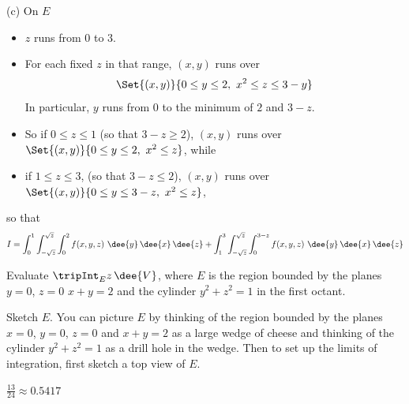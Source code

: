 \begin{solution}
(c) On $E$
\begin{itemize}
\item 
$z$ runs from $0$ to $3$.
\item
For each fixed $z$ in that range, $(x,y)$ runs over
\begin{equation*}
\Set{(x,y)}{0\le y\le 2,\ x^2\le z\le 3-y}
\end{equation*}
In particular, $y$ runs from $0$ to the minimum of $2$ and $3-z$.
\item 
So if $0\le z\le 1$ (so that $3-z\ge 2$), 
$(x,y)$ runs over $\Set{(x,y)}{0\le y\le 2,\ x^2\le z}$, while
\item
if $1\le z\le 3$, 
(so that $3-z\le 2$), 
$(x,y)$ runs over $\Set{(x,y)}{0\le y\le 3-z,\ x^2\le z}$,
\end{itemize}
so that
\begin{align*}
I= \int_0^1  \int_{-\sqrt{z}}^{\sqrt{z}}\int_0^2 f(x,y,z)\    
                 \dee{y}\,\dee{x}\,\dee{z}
+\int_1^3 \int_{-\sqrt{z}}^{\sqrt{z}}  \int_0^{3-z} f(x,y,z)\    
                 \dee{y}\,\dee{x}\,\dee{z}
\end{align*}
\end{solution}

\begin{question}[M200 2002D] %
Evaluate $\tripInt_E z\,\dee{V}$, where $E$ is the region bounded
by the planes $y=0$, $z=0$ $x+y=2$ and the cylinder $y^2+z^2=1$ in the
first octant.
\end{question}

\begin{hint}
Sketch $E$. You can picture $E$ by thinking of the region bounded by the
planes $x=0$, $y=0$, $z=0$ and $x+y=2$ as a large wedge of cheese and thinking
of the cylinder $y^2+z^2=1$ as a drill hole in the wedge. Then to set up
the limits of integration, first sketch a top view of $E$.
\end{hint}

\begin{answer}
$\frac{13}{24}\approx 0.5417$
\end{answer}

